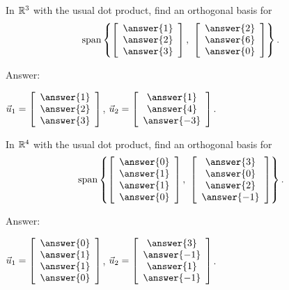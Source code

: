 \documentclass{ximera}
\author{Zack Reed}
\begin{document}
\begin{problem}\label{ex:orthogonal-basis-r3}
  In $\mathbb{R}^3$ with the usual dot product, find an orthogonal basis for
  \begin{equation*}
    \sspan\set{
      \startmat{c} \answer{1} \\ \answer{2} \\ \answer{3} \stopmat,~
      \startmat{c} \answer{2} \\ \answer{6} \\ \answer{0} \stopmat
    }.
  \end{equation*}

  Answer:
  
    $\vect{u}_1 = \startmat{c} \answer{1} \\ \answer{2} \\ \answer{3} \stopmat$,
    $\vect{u}_2 = \startmat{c} \answer{1} \\ \answer{4} \\ \answer{-3} \stopmat$.

\end{problem}

\begin{problem}
  In $\mathbb{R}^4$ with the usual dot product, find an orthogonal basis for
  \begin{equation*}
    \sspan\set{
      \startmat{c} \answer{0} \\ \answer{1} \\ \answer{1} \\  \answer{0} \stopmat,~
      \startmat{c} \answer{3} \\ \answer{0} \\ \answer{2} \\ \answer{-1} \stopmat
    }.
  \end{equation*}

  Answer:

    $\vect{u}_1 = \startmat{c} \answer{0} \\ \answer{1} \\ \answer{1} \\ \answer{0} \stopmat$,
    $\vect{u}_2 = \startmat{c} \answer{3} \\ \answer{-1} \\ \answer{1} \\ \answer{-1} \stopmat$.

\end{problem}
\end{document}
